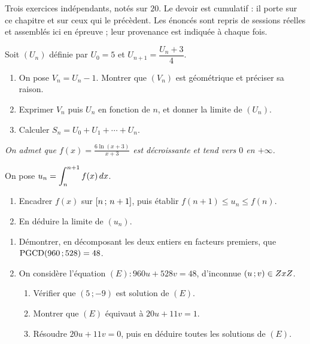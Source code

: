 \begin{devoir}[2 heures]
Trois exercices indépendants, notés sur $20$. Le devoir est cumulatif : il porte sur ce chapitre et sur ceux qui le précèdent. Les énoncés sont repris de sessions réelles et assemblés ici en épreuve ; leur provenance est indiquée à chaque fois.

Soit $(U_{n})$ définie par $U_{0} = 5$ et
$U_{n+1} = \dfrac{U_{n}+3}{4}$.
\begin{enumerate}[label=\textbf{\alph*)}, leftmargin=*, itemsep=0.15em]
  \item On pose $V_{n} = U_{n}-1$. Montrer que $(V_{n})$ est géométrique et
        préciser sa raison.
  \item Exprimer $V_{n}$ puis $U_{n}$ en fonction de $n$, et donner la limite
        de $(U_{n})$.
  \item Calculer $S_{n} = U_{0}+U_{1}+\cdots+U_{n}$.
\end{enumerate}

\emph{On admet que $f(x) = \frac{6\ln(x+3)}{x+3}$ est décroissante et tend
vers $0$ en $+\infty$.}

On pose $u_{n} = \displaystyle\int_{n}^{n+1}f(x)\,dx$.
\begin{enumerate}[label=\textbf{\alph*)}, leftmargin=*, itemsep=0.15em]
  \item Encadrer $f(x)$ sur $\left[n\,;\,n+1\right]$, puis établir
        $f(n+1) \leq u_{n} \leq f(n)$.
  \item En déduire la limite de $(u_{n})$.
\end{enumerate}

\begin{enumerate}[label=\textbf{\arabic*)}, leftmargin=*, itemsep=0.15em]
  \item Démontrer, en décomposant les deux entiers en facteurs premiers, que
        $\operatorname{PGCD}(960\,;528) = 48$.
  \item On considère l'équation $(E) : 960u+528v = 48$, d'inconnue
        $(u\,;v) \in ZxZ$.
        \begin{enumerate}[label=\textbf{\alph*)}, leftmargin=1.4em]
          \item Vérifier que $(5\,;-9)$ est solution de $(E)$.
          \item Montrer que $(E)$ équivaut à $20u+11v = 1$.
          \item Résoudre $20u+11v = 0$, puis en déduire toutes les solutions
                de $(E)$.
        \end{enumerate}
\end{enumerate}

\end{devoir}

